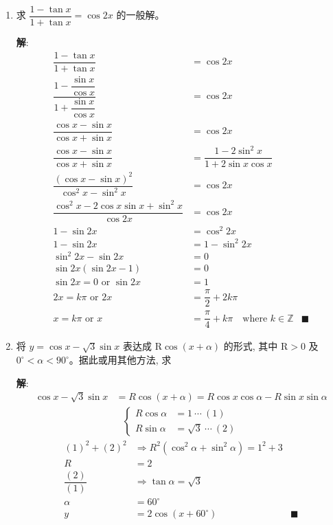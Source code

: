 \documentclass{report}
\newcommand{\sol}{\vspace{0.2cm}\textbf{解}:}
\begin{document}
\begin{enumerate}[leftmargin=*]
        \item 求 $\dfrac{1-\tan x}{1+\tan x}=\cos 2 x$ 的一般解。
        
        \sol{}
        \begin{align*}
            \dfrac{1-\tan x}{1+\tan x} &= \cos 2 x\\
            \dfrac{1-\dfrac{\sin x}{\cos x}}{1+\dfrac{\sin x}{\cos x}} &= \cos 2 x\\
            \dfrac{\cos x - \sin x}{\cos x + \sin x} &= \cos 2 x\\
            \dfrac{\cos x - \sin x}{\cos x + \sin x} &= \dfrac{1 - 2\sin^2 x}{1 + 2\sin x\cos x}\\
            \dfrac{(\cos x - \sin x)^2}{\cos^2 x - \sin^2 x} &= \cos 2x\\
            \dfrac{\cos^2 x - 2\cos x\sin x + \sin^2 x}{\cos 2x} &= \cos 2x\\
            1 - \sin 2x &= \cos^2 2x\\
            1 - \sin 2x &= 1 - \sin^2 2x\\
            \sin^2 2x - \sin 2x &= 0\\
            \sin 2x(\sin 2x - 1) &= 0\\
            \sin 2x = 0 \text{ or } \sin 2x &= 1\\
            2x = k\pi \text{ or } 2x &= \dfrac{\pi}{2} + 2k\pi\\
            x = k\pi \text{ or } x &= \dfrac{\pi}{4} + k\pi \quad \text{where } k \in \mathbb{Z} & \blacksquare
        \end{align*}
        
        \item 将 $y=\cos x-\sqrt{3} \sin x$ 表达成 $\mathrm{R} \cos (x+\alpha)$ 的形式, 其中 $\mathrm{R}>0$ 及 $0^{\circ}<\alpha<90^{\circ}$。据此或用其他方法, 求
        
        \sol{}
        \begin{align*}
            \cos x-\sqrt{3} \sin x &= R\cos(x + \alpha) = R\cos x\cos\alpha - R\sin x\sin\alpha
        \end{align*}
        \begin{align*}
            \begin{cases}
                R\cos\alpha &= 1\ \cdots\ (1)\\
                R\sin\alpha &= \sqrt{3}\ \cdots\ (2)
            \end{cases}
        \end{align*}
        \begin{align*}
            (1)^2 + (2)^2 &\Rightarrow R^2(\cos^2\alpha + \sin^2\alpha) = 1^2 + 3\\
            R &= 2\\
            \dfrac{(2)}{(1)} &\Rightarrow \tan\alpha = \sqrt{3}\\
            \alpha &= 60^{\circ}\\
            y &= 2\cos(x + 60^{\circ}) & \blacksquare
        \end{align*}


\end{enumerate}
\end{document}
